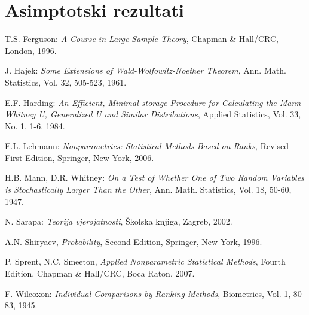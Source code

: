 \documentclass[ a4paper, 12pt]{report}
\numberwithin{Primjer}{chapter}
\renewcommand{\theequation}{\arabic{chapter}.\arabic{section}.\arabic{equation}}
\begin{document}
\chapter{Asimptotski rezultati}
%

%
%
\appendix
%
\renewcommand{\theequation}{A.\arabic{equation}}
%

%
%
%
\newpage
{}
\begin{thebibliography}{99}

 T.S. Ferguson:
\textit{A Course in Large Sample Theory},
Chapman \& Hall/CRC, London, 1996.

 J. Hajek:
\textit{Some Extensions of Wald-Wolfowitz-Noether Theorem},
Ann. Math. Statistics, Vol. 32, 505-523, 1961.

 E.F. Harding:
\textit{An Efficient, Minimal-storage Procedure for Calculating
the Mann-Whitney U, Generalized U and Similar Distributions},
Applied Statistics, Vol. 33, No. 1, 1-6. 1984.

 E.L. Lehmann:
\textit{Nonparametrics: Statistical Methods Based on Ranks},
Revised First Edition, Springer, New York, 2006.

 H.B. Mann, D.R. Whitney:
\textit{On a Test of Whether One of Two Random
Variables is Stochastically Larger Than the Other},
Ann. Math. Statistics, Vol. 18, 50-60, 1947.

 N. Sarapa: \textit{Teorija vjerojatnosti},
\v{S}kolska knjiga, Zagreb, 2002.

 A.N. Shiryaev, \textit{Probability},
Second Edition, Springer, New York, 1996.

 P. Sprent, N.C. Smeeton,
\textit{Applied Nonparametric Statistical Methods},
Fourth Edition, Chapman \& Hall/CRC, Boca Raton, 2007.

 F. Wilcoxon:
\textit{Individual Comparisons by Ranking Methods},
Biometrics, Vol. 1, 80-83, 1945.

\end{thebibliography}
%
\end{document}
